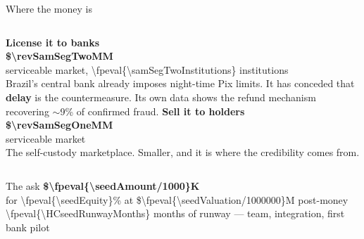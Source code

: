 \documentclass[aspectratio=169,12pt]{beamer}
\newcommand{\numint}[1]{\num[round-precision=0]{\fpeval{#1}}}
\newcommand{\huger}[1]{{\fontsize{56}{60}\selectfont\bfseries #1}}
\newcommand{\bignum}[1]{{\fontsize{34}{38}\selectfont\bfseries #1}}
\newcommand{\quiet}[1]{{\color{muted}#1}}
\begin{document}
\begin{frame}[t]{Where the money is}
  \vspace{0.6cm}
  \begin{columns}[T]
      \textbf{\large License it to banks}\\[0.4cm]
      \bignum{\$\num[round-precision=1]{\revSamSegTwoM}M}\\[0.2cm]
      serviceable market, \numint{\samSegTwoInstitutions} institutions\\[0.5cm]
      \quiet{Brazil's central bank already imposes night-time Pix limits.
      It has conceded that \textbf{delay} is the countermeasure. Its own data
      shows the refund mechanism recovering \(\sim\)9\% of confirmed fraud.}
      \textbf{\large Sell it to holders}\\[0.4cm]
      \bignum{\$\num[round-precision=1]{\revSamSegOneM}M}\\[0.2cm]
      serviceable market\\[0.5cm]
      \quiet{The self-custody marketplace. Smaller, and it is where the
      credibility comes from.}
  \end{columns}
\end{frame}

\begin{frame}[t]{The ask}
  \vspace{1.0cm}
  \centering
  \huger{\$\numint{\seedAmount/1000}K}\\[0.4cm]
  {\Large for \numint{\seedEquity}\% at \$\num[round-precision=1]{\fpeval{\seedValuation/1000000}}M post-money}\\[1.0cm]
  {\large \numint{\HCseedRunwayMonths} months of runway --- team, integration, first bank pilot}
  \vfill
\end{frame}

\begin{frame}[plain]
  \vfill\centering\quiet{\Large backup}\vfill
\end{frame}
\end{document}
